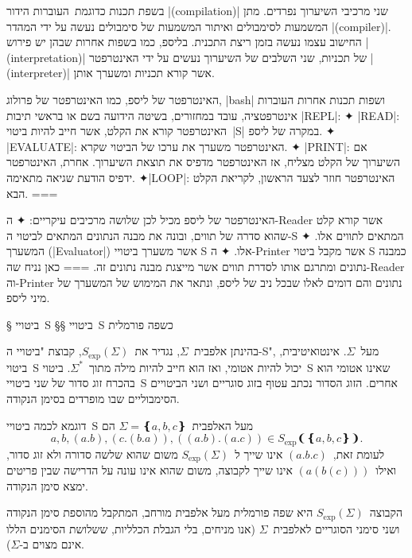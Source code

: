 בשפת תכנות כדוגמת~\CPL העוברות הידור \E|(compilation)| שני מרכיבי השיערוך
נפרדים. מתן המשמעות לסימבולים ואיתור המשמעות של סימבולים נעשה על ידי המהדר
\E|(compiler)|. החישוב עצמו נעשה בזמן ריצת התכנית. בליספ, כמו בשפות אחרות שבהן
יש פירוש \E|(interpretation)| של תכניות, שני השלבים של השיערוך נעשים על ידי
האינטרפטר \E|(interpreter)| אשר קורא תכניות ומשערך אותן.

\begin{minipage}\linewidth
\begin{mdframed}[backgroundcolor=Lavender!20]
האינטרפטר של ליספ, כמו האינטרפטר של פרולוג, \E|bash| ושפות תכנות אחרות העוברות
אינטרפטציה, עובד במחזורים, בשיטה הידועה בשם
או בראשי תיבות \E|REPL|:
✦ \E|READ|: האינטרפטר קורא את הקלט, אשר חייב להיות ביטוי~\E|S| במקרה של ליספ.
✦ \E|EVALUATE|: האינטרפטר משערך את ערכו של הביטוי שקרא.
✦ \E|PRINT|: אם השיערוך של הקלט מצליח, אז האינטרפטר מדפיס את תוצאת השיערוך.
אחרת, האינטרפטר ידפיס הודעת שגיאה מתאימה.
✦\E|LOOP|: האינטרפטר חוזר לצעד הראשון, לקריאת הקלט הבא.
===
\end{mdframed}
\end{minipage}

\normalsize

האינטרפטר של ליספ מכיל לכן שלושה מרכיבים עיקריים:
✦ ה-Reader אשר קורא קלט שהוא סדרה של תווים, ובונה את מבנה הנתונים המתאים
לביטוי ה-S המתאים לתווים אלו.
✦ המשערך (\E|Evaluator|) אשר משערך ביטויי S אלו.
✦ ה-Printer אשר מקבל ביטוי S כמבנה נתונים ומתרגם אותו לסדרת תווים אשר
מייצגת מבנה נתונים זה.
===
כאן נניח שה-Reader וה-Printer נתונים והם דומים לאלו שבכל ניב של ליספ, ונתאר את
המימוש של המשערך של מיני ליספ.

§ ביטויי~S
§§ ביטויי~S כשפה פורמלית

\newcommand\SX{\ensuremath{S_{\text{exp}}}}

בהינתן אלפבית~$Σ$, נגדיר את~$\SX(Σ)$, קבוצת "ביטויי ה-S", מעל~$Σ$.
אינטואיטיבית, ביטוי~S יכול להיות אטומי, ואז הוא חייב להיות מילה מתוך~$Σ^*$.
ביטוי~S שאינו אטומי הוא בהכרח זוג סדור של שני ביטויי~S אחרים. הזוג הסדור נכתב
עטוף בזוג סוגריים ושני הביטויים הסימבוליים שבו מופרדים בסימן הנקודה.

דוגמא לכמה ביטויי~S מעל האלפבית~$Σ=❴a,b,c❵$ הם \[
  a,b,(a.b),(c.(b.a)),((a.b).(a.c))∈\SX❨❴a,b,c❵❩.
\] לעומת זאת,~$(a.b.c)$ אינו שייך ל~$\SX(Σ)$ משום שהוא שלשה סדורה ולא זוג סדור,
ואילו~$(a(b(c)))$ אינו שייך לקבוצה, משום שהוא אינו עונה על הדרישה שבין פריטים
ימצא סימן הנקודה.

הקבוצה~$\SX(Σ)$ היא שפה פורמלית מעל אלפבית מורחב, המתקבל מהוספת סימן הנקודה
ושני סימני הסוגריים לאלפבית~$Σ$ (אנו מניחים, בלי הגבלת הכלליות, ששלושת הסימנים
הללו אינם מצוים ב-$Σ$).


